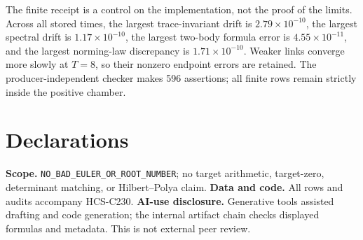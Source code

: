 \documentclass[10pt]{article}
\begin{document}
The finite receipt is a control on the implementation, not the proof of the
limits.  Across all stored times, the largest trace-invariant drift is
$2.79\times10^{-10}$, the largest spectral drift is $1.17\times10^{-10}$,
the largest two-body formula error is $4.55\times10^{-11}$, and the largest
norming-law discrepancy is $1.71\times10^{-10}$.  Weaker links converge more
slowly at $T=8$, so their nonzero endpoint errors are retained.  The
producer-independent checker makes 596 assertions; all finite rows remain
strictly inside the positive chamber.
\fi

\section*{Declarations}
\textbf{Scope.} \texttt{NO\_BAD\_EULER\_OR\_ROOT\_NUMBER}; no target arithmetic,
target-zero, determinant matching, or Hilbert--Polya claim.
\textbf{Data and code.} All rows and audits accompany HCS-C230.
\textbf{AI-use disclosure.} Generative tools assisted drafting and code
generation; the internal artifact chain checks displayed formulas and
metadata. This is not external peer review.
\end{document}
